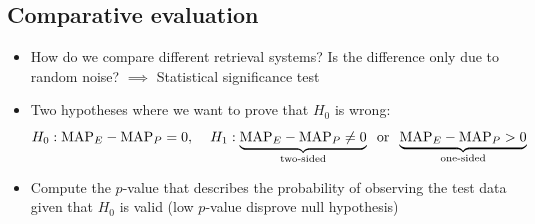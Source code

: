 \subsection{Comparative evaluation}
\begin{itemize}
	\item How do we compare different retrieval systems? Is the difference only due to random noise? $\implies$ Statistical significance test
	\item Two hypotheses where we want to prove that $H_0$ is wrong: $$H_0: \text{MAP}_E - \text{MAP}_P = 0, \hspace{4mm} H_1: \underbrace{\text{MAP}_E - \text{MAP}_P \neq 0}_{\text{two-sided}} \text{\hspace{2mm}or\hspace{2mm}}\underbrace{\text{MAP}_E - \text{MAP}_P > 0}_{\text{one-sided}}$$
	\item Compute the $p$-value that describes the probability of observing the test data given that $H_0$ is valid (low $p$-value disprove null hypothesis)
\end{itemize}
